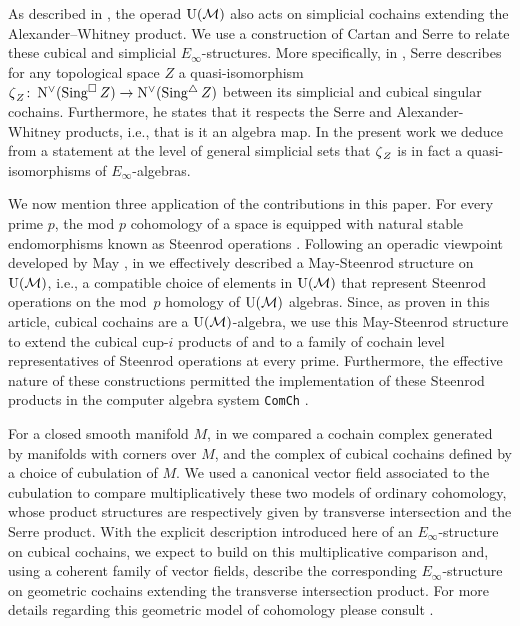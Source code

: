 As described in \cite{medina2020prop1}, the operad ${\operatorname{U}(\mathcal{M})}$ also acts on simplicial cochains extending the Alexander--Whitney product.
We use a construction of Cartan and Serre to relate these cubical and simplicial $E_\infty$-structures.
More specifically, in \cite[p. 442]{serre1951homologie}, Serre describes for any topological space $Z$ a quasi-isomorphism $\operatorname{\zeta}_Z \colon \operatorname{N^{\vee}}(\operatorname{Sing^{\square}} Z) \to \operatorname{N^{\vee}}(\operatorname{Sing^{\triangle}} Z)$ between its simplicial and cubical singular cochains.
Furthermore, he states that it respects the Serre and Alexander-Whitney products, i.e., that is it an algebra map.
In the present work we deduce from a statement at the level of general simplicial sets that $\operatorname{\zeta}_Z$ is in fact a quasi-isomorphisms of $E_\infty$-algebras.

We now mention three application of the contributions in this paper.
For every prime $p$, the mod $p$ cohomology of a space is equipped with natural stable endomorphisms known as Steenrod operations \cite{steenrod1962cohomology}.
Following an operadic viewpoint developed by May \cite{may1970general}, in \cite{medina2020maysteenrod} we effectively described a May-Steenrod structure on ${\operatorname{U}(\mathcal{M})}$, i.e., a compatible choice of elements in ${\operatorname{U}(\mathcal{M})}$ that represent Steenrod operations on the mod~$p$ homology of ${\operatorname{U}(\mathcal{M})}$ algebras.
Since, as proven in this article, cubical cochains are a ${\operatorname{U}(\mathcal{M})}$-algebra, we use this May-Steenrod structure to extend the cubical cup-$i$ products of \cite{kadeishvili2003cupi} and \cite{pilarczyk2016cubical} to a family of cochain level representatives of Steenrod operations at every prime.
Furthermore, the effective nature of these constructions permitted the implementation of these Steenrod products in the computer algebra system \texttt{ComCh} \cite{medina2021computer}.

For a closed smooth manifold $M$, in \cite{medina2021flowing} we compared a cochain complex generated by manifolds with corners over $M$, and the complex of cubical cochains defined by a choice of cubulation of $M$.
We used a canonical vector field associated to the cubulation to compare multiplicatively these two models of ordinary cohomology, whose product structures are respectively given by transverse intersection and the Serre product.
With the explicit description introduced here of an $E_\infty$-structure on cubical cochains, we expect to build on this multiplicative comparison and, using a coherent family of vector fields, describe the corresponding $E_\infty$-structure on geometric cochains extending the transverse intersection product.
For more details regarding this geometric model of cohomology please consult \cite{medina2021foundations}.

